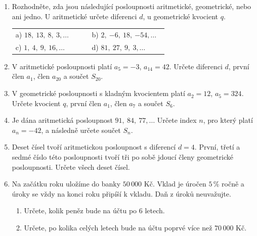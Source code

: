 \documentclass[a4paper,11pt]{article}
\newcommand{\AnswerSpace}[1]{\vspace{#1}}
\begin{document}
\begin{enumerate}
    \item Rozhodněte, zda jsou následující posloupnosti aritmetické,
    geometrické, nebo ani jedno. U aritmetické určete diferenci $d$,
    u geometrické kvocient $q$.

    \begin{tabular}{@{}p{0.47\linewidth}p{0.47\linewidth}@{}}
        a) $18,\ 13,\ 8,\ 3,\ldots$ & b) $2,\ {-6},\ 18,\ {-54},\ldots$ \\[5mm]
        c) $1,\ 4,\ 9,\ 16,\ldots$ & d) $81,\ 27,\ 9,\ 3,\ldots$
    \end{tabular}
    \AnswerSpace{4mm}

    \item V aritmetické posloupnosti platí $a_5=-3$, $a_{14}=42$.
    Určete diferenci $d$, první člen $a_1$, člen $a_{20}$ a součet $S_{20}$.
    \AnswerSpace{19mm}

    \item V geometrické posloupnosti s kladným kvocientem platí
    $a_2=12$, $a_5=324$. Určete kvocient $q$, první člen $a_1$,
    člen $a_7$ a součet $S_6$.
    \AnswerSpace{20mm}

    \item Je dána aritmetická posloupnost $91,\ 84,\ 77,\ldots$
    Určete index $n$, pro který platí $a_n=-42$, a následně určete součet $S_n$.
    \AnswerSpace{17mm}

    \item Deset čísel tvoří aritmetickou posloupnost s diferencí $d=4$.
    První, třetí a sedmé číslo této posloupnosti tvoří tři po sobě jdoucí
    členy geometrické posloupnosti. Určete všech deset čísel.
    \AnswerSpace{24mm}

    \item Na začátku roku uložíme do banky $50\,000$ Kč. Vklad je úročen
    $5\,\%$ ročně a úroky se vždy na konci roku připíší k vkladu.
    Daň z úroků neuvažujte.
    \begin{enumerate}[label=\alph*),topsep=1pt,itemsep=1pt]
        \item Určete, kolik peněz bude na účtu po 6 letech.
        \item Určete, po kolika celých letech bude na účtu poprvé více
        než $70\,000$ Kč.
    \end{enumerate}
    \AnswerSpace{20mm}
\end{enumerate}
\end{document}
